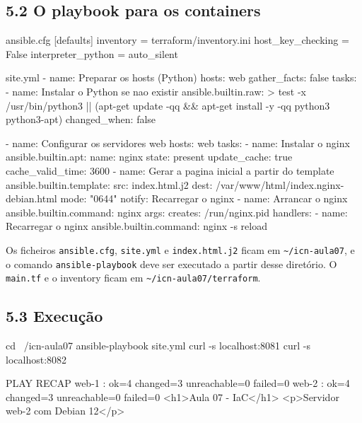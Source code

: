\documentclass[11pt,a4paper]{article}
\newcommand{\cmd}[1]{\texttt{#1}}
\begin{document}
\subsection*{5.2 O playbook para os containers}

\begin{ficheiro}{ansible.cfg}
[defaults]
inventory = terraform/inventory.ini
host_key_checking = False
interpreter_python = auto_silent
\end{ficheiro}

\begin{ficheiro}{site.yml}
- name: Preparar os hosts (Python)
  hosts: web
  gather_facts: false
  tasks:
    - name: Instalar o Python se nao existir
      ansible.builtin.raw: >
        test -x /usr/bin/python3 ||
        (apt-get update -qq && apt-get install -y -qq python3 python3-apt)
      changed_when: false

- name: Configurar os servidores web
  hosts: web
  tasks:
    - name: Instalar o nginx
      ansible.builtin.apt:
        name: nginx
        state: present
        update_cache: true
        cache_valid_time: 3600
    - name: Gerar a pagina inicial a partir do template
      ansible.builtin.template:
        src: index.html.j2
        dest: /var/www/html/index.nginx-debian.html
        mode: "0644"
      notify: Recarregar o nginx
    - name: Arrancar o nginx
      ansible.builtin.command: nginx
      args:
        creates: /run/nginx.pid
  handlers:
    - name: Recarregar o nginx
      ansible.builtin.command: nginx -s reload
\end{ficheiro}

\begin{nota}
Os ficheiros \cmd{ansible.cfg}, \cmd{site.yml} e \cmd{index.html.j2} ficam em \cmd{\textasciitilde/icn-aula07}, e o comando \cmd{ansible-playbook} deve ser executado a partir desse diretório. O \cmd{main.tf} e o inventory ficam em \cmd{\textasciitilde/icn-aula07/terraform}.
\end{nota}

\subsection*{5.3 Execução}

\begin{terminal}
cd ~/icn-aula07
ansible-playbook site.yml
curl -s localhost:8081
curl -s localhost:8082
\end{terminal}

\begin{saida}
PLAY RECAP
web-1 : ok=4  changed=3  unreachable=0  failed=0
web-2 : ok=4  changed=3  unreachable=0  failed=0
<h1>Aula 07 - IaC</h1>
<p>Servidor web-2 com Debian 12</p>
\end{saida}
\end{document}
